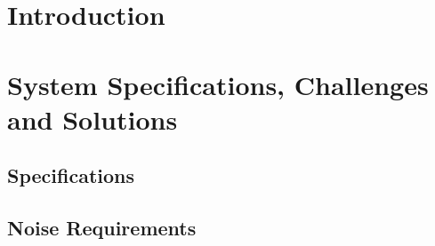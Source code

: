\documentclass[12pt,letterpaper]{memoir}
\numberwithin{equation}{chapter}
\numberwithin{figure}{chapter}
\numberwithin{table}{chapter}
\begin{document}
\newpage
\listoffigures

\mainmatter

\chapter{Introduction}\label{c:intro}





\chapter{System Specifications, Challenges and Solutions}\label{c:specs}

\section{Specifications} \label{sec:ch2-specifications}

\section{Noise Requirements} \label{sec:ch2-noise}











\SingleSpacing
\printbibliography
\end{document}
